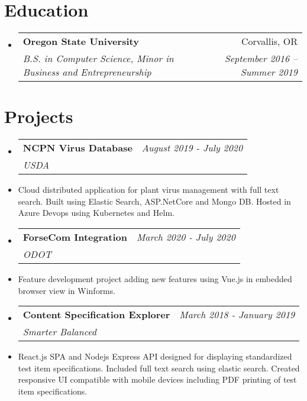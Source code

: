\documentclass[letterpaper,11pt]{article}
\makeatletter
\newcommand{\resumeSubheading}[4]{
  \vspace{-1pt}\item
    \begin{tabular*}{0.97\textwidth}{l@{\extracolsep{\fill}}r}
      \textbf{\Large#1} & #2 \\
      \textit{\small#3} & \textit{\small #4} \\
    \end{tabular*}\vspace{-5pt}
}
\newcommand{\resumeSubHeadingListStart}{\begin{itemize}[label={},leftmargin=*]}
\newcommand{\resumeSubHeadingListEnd}{\end{itemize}}
\makeatother
\begin{document}
\section{Education}
  \resumeSubHeadingListStart
    \resumeSubheading
      {Oregon State University}{Corvallis, OR}
      {B.S. in Computer Science, Minor in Business and Entrepreneurship}{September 2016 -- Summer 2019}
  \resumeSubHeadingListEnd

\section{Projects}
  \resumeSubHeadingListStart
    \resumeSubheading
    {NCPN Virus Database}{\textit{August 2019 - July 2020 }}
    {USDA}{}
        \item{Cloud distributed application for plant virus management with full text search. Built using Elastic Search, ASP.NetCore and Mongo DB. Hosted in Azure Devops using Kubernetes and Helm.}\newline \hfill
        
    \resumeSubheading
    {ForseCom Integration}{ \textit{March 2020 - July 2020}}
    {ODOT}{}
        \item{Feature development project adding new features using Vue.js in embedded browser view in Winforms.} \newline \hfill
    \resumeSubheading
        {Content Specification Explorer}{\textit{March 2018 - January 2019}}
    {Smarter Balanced}{}
        \item{React.js SPA and Nodejs Express API designed for displaying standardized test item specifications. Included full text search using elastic search. Created responsive UI compatible with mobile devices including PDF printing of test item specifications.} \newline \hfill
        

  \resumeSubHeadingListEnd
\end{document}
